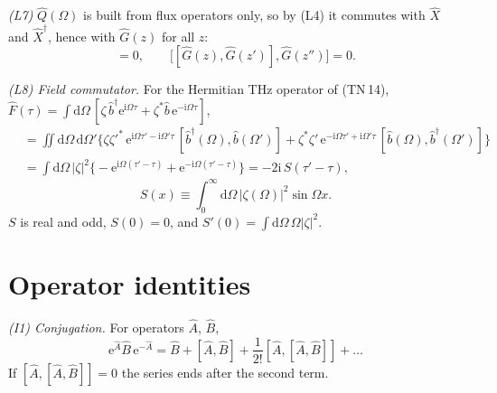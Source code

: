 \documentclass[aps,pra,onecolumn,notitlepage,11pt,amsmath,amssymb,nofootinbib]{revtex4-2}
\newcommand{\Qop}{\hat Q}
\newcommand{\Xop}{\hat X}
\newcommand{\dd}{\mathrm{d}}
\newcommand{\ee}{\mathrm{e}}
\newcommand{\ii}{\mathrm{i}}
\begin{document}
\emph{(L7)} $\Qop(\Omega)$ is built from flux operators only, so by (L4) it
commutes with $\Xop$ and $\Xop^\dagger$, hence with $\hat G(z)$ for all $z$:
\begin{equation}
[\Qop(\Omega),\hat G(z)]=0,\qquad
\big[[\hat G(z),\hat G(z')],\hat G(z'')\big]=0 .
\label{eq:L7}
\end{equation}

\emph{(L8) Field commutator.} For the Hermitian THz operator of (TN\,14),
$\hat F(\tau)=\int\dd\Omega\,[\zeta\,\hat b^\dagger\ee^{\ii\Omega\tau}
+\zeta^*\hat b\,\ee^{-\ii\Omega\tau}]$,
\begin{align}
[\hat F(\tau'),\hat F(\tau)]
&=\iint\!\dd\Omega\,\dd\Omega'\Big\{\zeta\zeta'^*\,
\ee^{\ii\Omega\tau'-\ii\Omega'\tau}\,[\hat b^\dagger(\Omega),\hat b(\Omega')]
+\zeta^*\zeta'\,\ee^{-\ii\Omega\tau'+\ii\Omega'\tau}\,[\hat b(\Omega),\hat b^\dagger(\Omega')]\Big\}\nonumber\\
&=\int\!\dd\Omega\,|\zeta|^2\Big\{-\ee^{\ii\Omega(\tau'-\tau)}+\ee^{-\ii\Omega(\tau'-\tau)}\Big\}
=-2\ii\,S(\tau'-\tau),
\label{eq:L8}
\end{align}
\begin{equation}
S(x)\equiv\int_0^\infty\!\!\dd\Omega\,|\zeta(\Omega)|^2\sin\Omega x .
\label{eq:S}
\end{equation}
$S$ is real and odd, $S(0)=0$, and $S'(0)=\int\dd\Omega\,\Omega|\zeta|^2$.

\section{Operator identities}
\label{sec:ident}

\emph{(I1) Conjugation.} For operators $\hat A$, $\hat B$,
\begin{equation}
\ee^{\hat A}\hat B\,\ee^{-\hat A}=\hat B+[\hat A,\hat B]
+\frac{1}{2!}[\hat A,[\hat A,\hat B]]+\dots
\label{eq:I1}
\end{equation}
If $[\hat A,[\hat A,\hat B]]=0$ the series ends after the second term.
\end{document}
